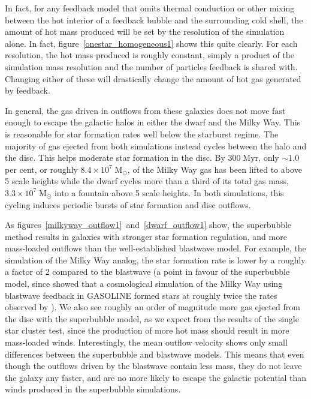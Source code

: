 In fact, for any feedback model that omits thermal conduction or other mixing
between the hot interior of a feedback bubble and the surrounding cold shell,
the amount of hot mass produced will be set by the resolution of the simulation
alone.  In fact, figure~\ref{onestar_homogeneous1} shows this quite clearly.  For
each resolution, the hot mass produced is roughly constant, simply a product of
the simulation mass resolution and the number of particles feedback is shared
with.  Changing either of these will drastically change the amount of hot gas
generated by feedback.  

In general, the gas driven in outflows from these galaxies does not move fast
enough to escape the galactic halos in either the dwarf and the Milky Way.  This
is reasonable for star formation rates well below the starburst regime.  The
majority of gas ejected from both simulations instead cycles between the halo
and the disc.  This helps moderate star formation in the disc.  By
$300\;\mathrm{Myr}$, only $\sim 1.0$ per cent, or roughly
$8.4\times10^7\;\mathrm{M_\odot}$, of the Milky Way gas has been lifted to above
5 scale heights while the dwarf cycles more than a third of its total gas mass,
$3.3\times10^7\; \mathrm{M_\odot}$ into a fountain above 5 scale heights.  In
both simulations, this cycling induces periodic bursts of star formation and
disc outflows.

As figures~\ref{milkyway_outflow1}~and~\ref{dwarf_outflow1} show, the superbubble
method results in galaxies with stronger star formation regulation, and
more mass-loaded outflows than the well-established blastwave model.  
For example, the simulation of the Milky Way analog, the star
formation rate is lower by a roughly a factor of 2 compared to the blastwave (a
point in favour of the superbubble model, since \citet{Scannapieco2012} showed
that a cosmological simulation of the Milky Way using blastwave feedback in
{\sc GASOLINE} formed stars at roughly twice the rates observed by
\citet{Guo2011}).  We also see roughly an order of magnitude more gas ejected
from the disc with the superbubble model, as we expect from the results of the
single star cluster test, since the production of more hot mass should result in
more mass-loaded winds.  Interestingly, the mean outflow velocity shows only
small differences between the superbubble and blastwave models.  This means that
even though the outflows driven by the blastwave contain less mass, they do not
leave the galaxy any faster, and are no more likely to escape the galactic
potential than winds produced in the superbubble simulations.

